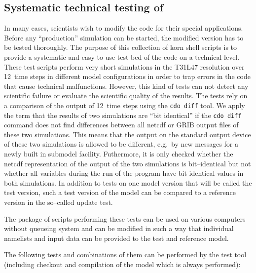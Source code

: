 \subsection[Systematic technical testing of \echambw]{Systematic technical testing of \echam}
In many cases, scientists wish to modify the \echam{} code for their
special applications. Before any ``production'' simulation can be
started, the modified \echam{} version has to be tested thoroughly. 
The purpose of this collection of korn shell scripts is to provide a
systematic and easy to use test bed of the \echam{} code on a technical
level. These test scripts perform very short simulations in the T31L47
resolution over 12~time
steps in different model configurations in order to trap errors in
the code that cause technical malfunctions. However, this kind of tests can
not detect any 
scientific failure or evaluate the scientific quality of the
results. The tests rely on a
comparison of the output of 12~time steps using the
{\tt cdo diff} tool. We apply the term that the results of two
simulations are ``bit
identical'' if the {\tt cdo diff} command does not find differences
between all netcdf or GRIB output files of these two simulations. This means
that the output on the standard output device of these two simulations
is allowed to be different, e.g.~by new messages for a newly built in
submodel facility. Futhermore, it is only checked whether the netcdf
representation of the output of the two simulations is bit--identical
but not whether all variables during the run of the \echam{} program have
bit identical values in both simulations. 
In addition to tests on one model version that will be called the
test version, such a test version of the model can be compared to a
reference version in the so--called update test.
 
The package of scripts performing these tests can be used on various
computers without queueing system and can be modified in such a
way that individual namelists and input data can be provided to the
test and reference model.

The following tests and combinations of them can be performed by the
test tool (including checkout and compilation of the model which is
always performed): 


